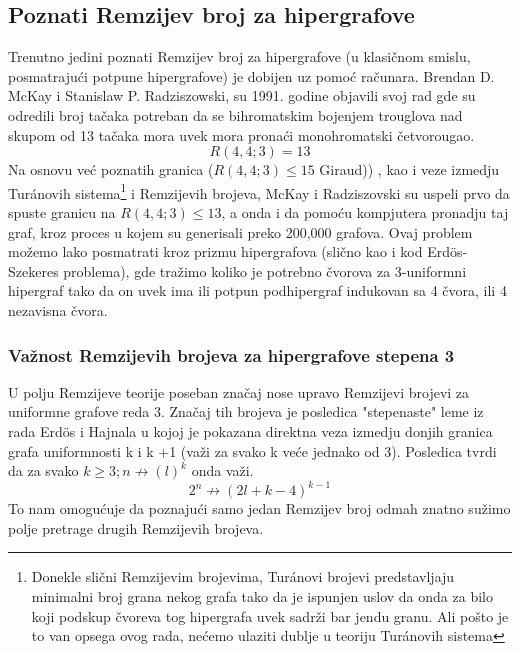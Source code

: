 \documentclass[a4paper]{article}
\begin{document}
	\subsection{Poznati Remzijev broj za hipergrafove}%
	Trenutno jedini poznati Remzijev broj za hipergrafove (u klasičnom smislu, posmatrajući potpune hipergrafove)\cite{pregled}%
	 je dobijen uz pomoć računara. Brendan D. McKay i Stanislaw P. Radziszowski, su 1991. godine objavili svoj rad \textcite{HGremzibroj} gde su odredili broj tačaka potreban da se bihromatskim bojenjem trouglova nad skupom od 13 tačaka mora uvek mora pronaći monohromatski četvorougao.%
	\begin{equation}
		R(4, 4; 3) = 13
	\end{equation}
	Na osnovu već poznatih granica ($R(4, 4; 3) \leq 15$ Giraud))%
	, kao i veze izmedju Tur\'{a}novih sistema\footnote{Donekle slični Remzijevim brojevima, Tur\'{a}novi brojevi predstavljaju minimalni broj grana nekog grafa tako da je ispunjen uslov da onda za bilo koji podskup čvoreva tog hipergrafa uvek sadrži bar jendu granu. Ali pošto je to van opsega ovog rada, nećemo ulaziti dublje u teoriju Tur\'{a}novih sistema } i Remzijevih brojeva, McKay i Radziszovski su uspeli prvo da spuste granicu na $R(4, 4; 3) \leq 13$, a onda i da pomoću kompjutera pronadju taj graf, kroz proces u kojem su generisali preko 200,000 grafova. Ovaj problem možemo lako posmatrati kroz prizmu hipergrafova (slično kao i kod Erd\"{o}s-Szekeres problema), gde tražimo koliko je potrebno čvorova za 3-uniformni hipergraf tako da on uvek ima ili potpun podhipergraf indukovan sa 4 čvora, ili 4  nezavisna čvora. %
	\subsubsection{Važnost Remzijevih brojeva za hipergrafove stepena 3}
	U polju Remzijeve teorije poseban značaj nose upravo Remzijevi brojevi za uniformne grafove reda 3. Značaj tih brojeva je posledica "stepenaste" leme iz rada Erd\"{o}s i Hajnala \cite{posledice3remzi} %
	 u kojoj je pokazana direktna veza izmedju donjih granica grafa uniformnosti k i k +1 (važi za svako k veće jednako od 3). Posledica tvrdi da za svako $k \geq 3; n \not\rightarrow (l)^k$ onda važi. \cite{matoraknjigajedvanadjena}
	\begin{equation}
		2^n \not\rightarrow (2l + k - 4)^{k-1}
	\end{equation}
	To nam omogućuje da poznajući samo jedan Remzijev broj odmah znatno sužimo polje pretrage drugih Remzijevih brojeva.
\end{document}
